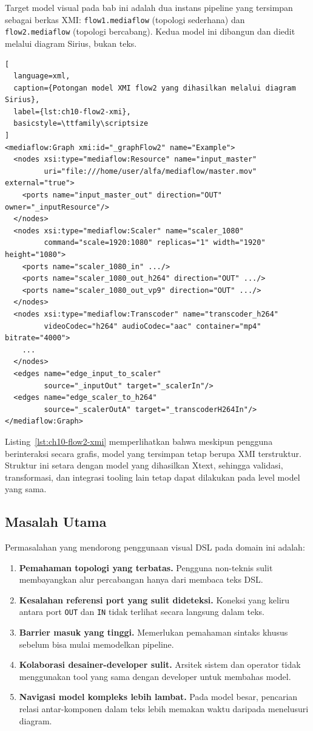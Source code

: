 Target model visual pada bab ini adalah dua instans pipeline yang tersimpan sebagai berkas XMI: \texttt{flow1.mediaflow} (topologi sederhana) dan \texttt{flow2.mediaflow} (topologi bercabang). Kedua model ini dibangun dan diedit melalui diagram Sirius, bukan teks.

\begin{lstlisting}[
  language=xml,
  caption={Potongan model XMI flow2 yang dihasilkan melalui diagram Sirius},
  label={lst:ch10-flow2-xmi},
  basicstyle=\ttfamily\scriptsize
]
<mediaflow:Graph xmi:id="_graphFlow2" name="Example">
  <nodes xsi:type="mediaflow:Resource" name="input_master"
         uri="file:///home/user/alfa/mediaflow/master.mov" external="true">
    <ports name="input_master_out" direction="OUT" owner="_inputResource"/>
  </nodes>
  <nodes xsi:type="mediaflow:Scaler" name="scaler_1080"
         command="scale=1920:1080" replicas="1" width="1920" height="1080">
    <ports name="scaler_1080_in" .../>
    <ports name="scaler_1080_out_h264" direction="OUT" .../>
    <ports name="scaler_1080_out_vp9" direction="OUT" .../>
  </nodes>
  <nodes xsi:type="mediaflow:Transcoder" name="transcoder_h264"
         videoCodec="h264" audioCodec="aac" container="mp4" bitrate="4000">
    ...
  </nodes>
  <edges name="edge_input_to_scaler"
         source="_inputOut" target="_scalerIn"/>
  <edges name="edge_scaler_to_h264"
         source="_scalerOutA" target="_transcoderH264In"/>
</mediaflow:Graph>
\end{lstlisting}

\noindent Listing~\ref{lst:ch10-flow2-xmi} memperlihatkan bahwa meskipun pengguna berinteraksi secara grafis, model yang tersimpan tetap berupa XMI terstruktur. Struktur ini setara dengan model yang dihasilkan Xtext, sehingga validasi, transformasi, dan integrasi tooling lain tetap dapat dilakukan pada level model yang sama.

\subsection{Masalah Utama}

Permasalahan yang mendorong penggunaan visual DSL pada domain ini adalah:
\begin{enumerate}
  \item \textbf{Pemahaman topologi yang terbatas.} Pengguna non-teknis sulit membayangkan alur percabangan hanya dari membaca teks DSL.
  \item \textbf{Kesalahan referensi port yang sulit dideteksi.} Koneksi yang keliru antara port \texttt{OUT} dan \texttt{IN} tidak terlihat secara langsung dalam teks.
  \item \textbf{Barrier masuk yang tinggi.} Memerlukan pemahaman sintaks khusus sebelum bisa mulai memodelkan pipeline.
  \item \textbf{Kolaborasi desainer-developer sulit.} Arsitek sistem dan operator tidak menggunakan tool yang sama dengan developer untuk membahas model.
  \item \textbf{Navigasi model kompleks lebih lambat.} Pada model besar, pencarian relasi antar-komponen dalam teks lebih memakan waktu daripada menelusuri diagram.
\end{enumerate}

